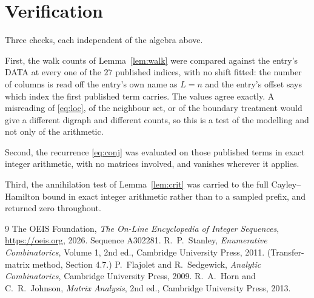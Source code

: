 \documentclass[11pt,a4paper]{article}
\theoremstyle{plain}
\theoremstyle{definition}
\begin{document}
\section{Verification}

Three checks, each independent of the algebra above.

First, the walk counts of Lemma~\ref{lem:walk} were compared against the entry's DATA at
every one of the $27$ published indices, with no shift fitted: the number of columns is
read off the entry's own name as $L=n$ and the entry's offset says which index the first
published term carries. The values agree exactly. A misreading of \eqref{eq:loc}, of the
neighbour set, or of the boundary treatment would give a different digraph and different
counts, so this is a test of the modelling and not only of the arithmetic.

Second, the recurrence \eqref{eq:conj} was evaluated on those published terms in exact
integer arithmetic, with no matrices involved, and vanishes wherever it applies.

Third, the annihilation test of Lemma~\ref{lem:crit} was carried to the full
Cayley--Hamilton bound in exact integer arithmetic rather than to a sampled prefix, and
returned zero throughout.

\begin{thebibliography}{9}
 The OEIS Foundation, \emph{The On-Line Encyclopedia of Integer
Sequences}, \url{https://oeis.org}, 2026. Sequence A302281.
 R.~P.~Stanley, \emph{Enumerative Combinatorics}, Volume 1, 2nd ed.,
Cambridge University Press, 2011. (Transfer-matrix method, Section 4.7.)
 P.~Flajolet and R.~Sedgewick, \emph{Analytic Combinatorics}, Cambridge
University Press, 2009.
 R.~A.~Horn and C.~R.~Johnson, \emph{Matrix Analysis}, 2nd ed., Cambridge
University Press, 2013.
\end{thebibliography}
\end{document}
